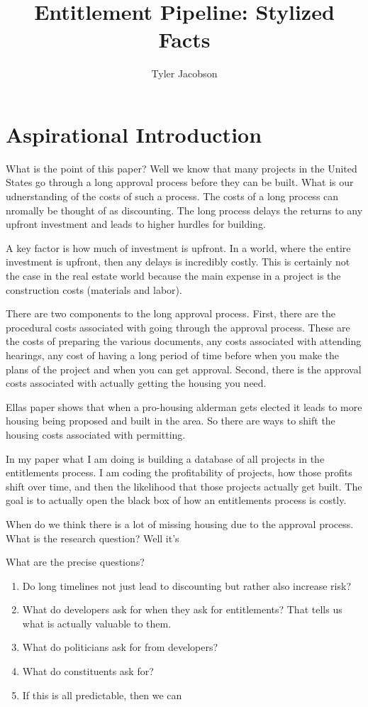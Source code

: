 \documentclass[12pt]{article}
\title{Entitlement Pipeline: Stylized Facts}
\author{Tyler Jacobson}
\theoremstyle{definition}
\begin{document}
\maketitle
\section{Aspirational Introduction}






What is the point of this paper? Well we know that many projects in the United States go through a long approval process before they can be built. What is our udnerstanding of the costs of such a process. The costs of a long process can nromally be thought of as discounting. The long process delays the returns to any upfront investment and leads to higher hurdles for building. 

A key factor is how much of investment is upfront. In a world, where the entire investment is upfront, then any delays is incredibly costly. This is certainly not the case in the real estate world because the main expense in a project is the construction costs (materials and labor). 

There are two components to the long approval process. First, there are the procedural costs associated with going through the approval process. These are the costs of preparing the various documents, any costs associated with attending hearings, any cost of having a long period of time before when you make the plans of the project and when you can get approval. Second, there is the approval costs associated with actually getting the housing you need. 

Ellas paper shows that when a pro-housing alderman gets elected it leads to more housing being proposed and built in the area. So there are ways to shift the housing costs associated with permitting. 

In my paper what I am doing is building a database of all projects in the entitlements process. I am coding the profitability of projects, how those profits shift over time, and then the likelihood that those projects actually get built. The goal is to actually open the black box of how an entitlements process is costly. 

When do we think there is a lot of missing housing due to the approval process. What is the research question? Well it's 

What are the precise questions? 
\begin{enumerate}
    \item Do long timelines not just lead to discounting but rather also increase risk? 
    \item What do developers ask for when they ask for entitlements? That tells us what is actually valuable to them. 
    \item What do politicians ask for from developers? 
    \item What do constituents ask for? 
    \item If this is all predictable, then we can 
\end{enumerate}
\end{document}
